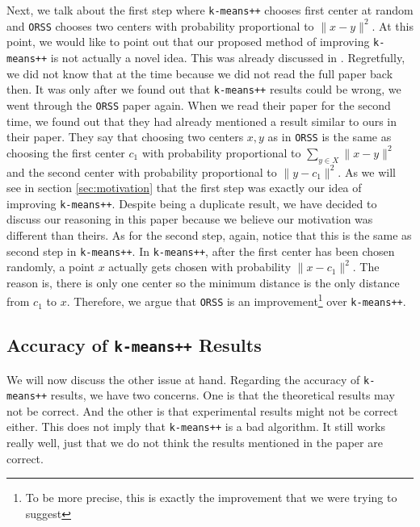 \documentclass[twoside, 11pt]{article}
\begin{document}
	Next, we talk about the first step where \texttt{k-means++} chooses first center at random and \texttt{ORSS} chooses two centers with probability proportional to $\|x-y\|^2$. At this point, we would like to point out that our proposed method of improving \texttt{k-means++} is not actually a novel idea. This was already discussed in \citet{ostrovsky}. Regretfully, we did not know that at the time because we did not read the full paper back then. It was only after we found out that \texttt{k-means++} results could be wrong, we went through the \texttt{ORSS} paper again. When we read their paper for the second time, we found out that they had already mentioned a result \cite[Page 4, section 3, Paragraph: Running Time]{ostrovsky} similar to ours in their paper. They say that choosing two centers $x,y$ as in \texttt{ORSS} is the same as choosing the first center $c_1$ with probability proportional to $\sum_{y\in X}\|x-y\|^2$ and the second center with probability proportional to $\|y-c_1\|^2$. As we will see in section \ref{sec:motivation} that the first step was exactly our idea of improving \texttt{k-means++}. Despite being a duplicate result, we have decided to discuss our reasoning in this paper because we believe our motivation was different than theirs. As for the second step, again, notice that this is the same as second step in \texttt{k-means++}. In \texttt{k-means++}, after the first center has been chosen randomly, a point $x$ actually gets chosen with probability $\|x-c_1\|^2$. The reason is, there is only one center so the minimum distance is the only distance from $c_1$ to $x$. Therefore, we argue that \texttt{ORSS} is an improvement\footnote{To be more precise, this is exactly the improvement that we were trying to suggest} over \texttt{k-means++}.
	\subsection{Accuracy of \texttt{k-means++} Results}
	We will now discuss the other issue at hand. Regarding the accuracy of \texttt{k-means++} results, we have two concerns. One is that the theoretical results may not be correct. And the other is that experimental results might not be correct either. This does not imply that \texttt{k-means++} is a bad algorithm. It still works really well, just that we do not think the results mentioned in the paper are correct.
	
\end{document}
